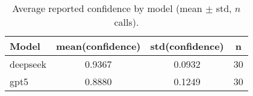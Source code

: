 \begin{table}[h]
\centering
\caption{Average reported confidence by model (mean $\pm$ std, $n$ calls).}
\label{tab:avg-conf}
\begin{tabular}{lccc}
\hline
Model & mean(confidence) & std(confidence) & n \\
\hline
deepseek & 0.9367 & 0.0932 & 30 \\
gpt5 & 0.8880 & 0.1249 & 30 \\
\hline
\end{tabular}
\end{table}